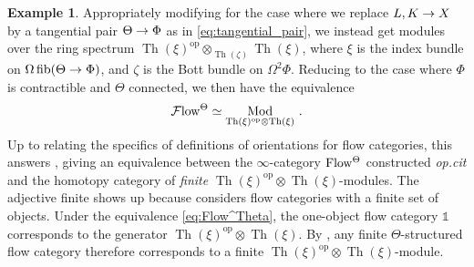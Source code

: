 \documentclass[10pt]{amsart}
\numberwithin{equation}{section}
\theoremstyle{definition}
\newtheorem{ex}[prop]{Example}
\DeclareMathOperator{\Th}{Th}
\DeclareMathOperator{\Mod}{Mod}
\DeclareMathOperator{\op}{op}
\DeclareMathOperator{\fib}{fib}
\newcommand{\Flow}{\cF\mathrm{low}\vphantom{w}}
\newcommand{\PreFlow}{\mathrm{Flow}\vphantom{w}}
\newcommand{\bOne}{\mathbb{1}}
\newcommand{\cF}{\mathcal{F}}
\renewcommand{\to}{\mathchoice{\longrightarrow}{\rightarrow}{}{}}
\begin{document}
\begin{ex}\label{ex:tangential_pair}
	Appropriately modifying  for the case where we replace $L,K \to X$ by a tangential pair $\Theta \to \Phi$ as in \eqref{eq:tangential_pair}, we instead get modules over the ring spectrum $\Th(\xi)^{\op}\otimes_{\Th(\zeta)} \Th(\xi)$, where $\xi$ is the index bundle on $\Omega\fib(\Theta\to \Phi)$, and $\zeta$ is the Bott bundle on $\Omega^{2}\Phi$.
  Reducing to the case where $\Phi$ is contractible and $\Theta$ connected, we then have the equivalence
	\begin{align}\label{eq:Flow^Theta}
		\Flow^{\Theta} \simeq \Mod_{\Th(\xi)^{\op} \otimes \Th(\xi)} \,.
	\end{align}
	Up to relating the specifics of definitions of orientations for flow categories, this answers \cite[Conjecture 5.10]{porcelli2024spectral}, giving an equivalence between the $\infty$-category $\PreFlow^{\Theta}$ constructed \emph{op.cit} and the homotopy category of \emph{finite} $\Th(\xi)^{\op}\otimes\Th(\xi)$-modules.
  The adjective finite shows up because \cite{porcelli2024spectral} considers flow categories with a finite set of objects.
  Under the equivalence \eqref{eq:Flow^Theta}, the one-object flow category $\bOne$ corresponds to the generator $\Th(\xi)^{\op} \otimes \Th(\xi)$.
  By , any finite $\Theta$-structured flow category therefore corresponds to a finite $\Th(\xi)^{\op} \otimes \Th(\xi)$-module.
\end{ex}
\end{document}

